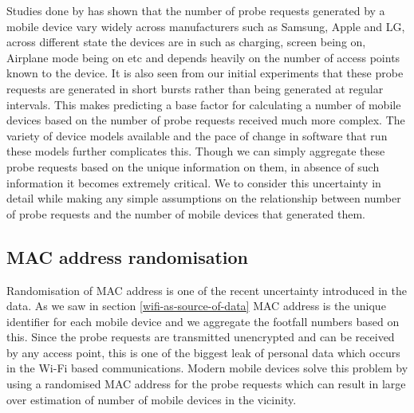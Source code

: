 Studies done by \citet{freud2015}\cite{freud2015} has shown that the number of probe requests generated by a mobile device vary widely across manufacturers such as Samsung, Apple and LG, across different state the devices are in such as charging, screen being on, Airplane mode being on etc and depends heavily on the number of access points known to the device.
It is also seen from our initial experiments that these probe requests are generated in short bursts rather than being generated at regular intervals.
This makes predicting a base factor for calculating a number of mobile devices based on the number of probe requests received much more complex.
The variety of device models available and the pace of change in software that run these models further complicates this.
Though we can simply aggregate these probe requests based on the unique information on them, in absence of such information it becomes extremely critical.
We to consider this uncertainty in detail while making any simple assumptions on the relationship between number of probe requests and the number of mobile devices that generated them.

\subsection{MAC address randomisation}
Randomisation of MAC address is one of the recent uncertainty introduced in the data.
As we saw in section \ref{wifi-as-source-of-data} MAC address is the unique identifier for each mobile device and we aggregate the footfall numbers based on this.
Since the probe requests are transmitted unencrypted and can be received by any access point, this is one of the biggest leak of personal data which occurs in the Wi-Fi based communications.
Modern mobile devices solve this problem by using a randomised MAC address for the probe requests which can result in large over estimation of number of mobile devices in the vicinity.

